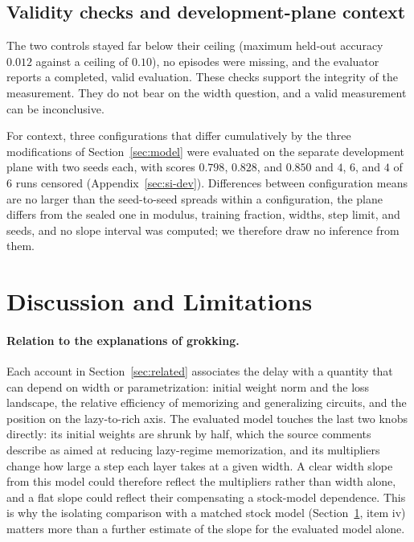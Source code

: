 \documentclass{article}
\begin{document}
\subsection{Validity checks and development-plane context}
The two controls stayed far below their ceiling (maximum held-out accuracy $0.012$ against a ceiling of $0.10$), no episodes were missing, and the evaluator reports a completed, valid evaluation. These checks support the integrity of the measurement. They do not bear on the width question, and a valid measurement can be inconclusive.

For context, three configurations that differ cumulatively by the three modifications of Section~\ref{sec:model} were evaluated on the separate development plane with two seeds each, with scores $0.798$, $0.828$, and $0.850$ and $4$, $6$, and $4$ of $6$ runs censored (Appendix~\ref{sec:si-dev}). Differences between configuration means are no larger than the seed-to-seed spreads within a configuration, the plane differs from the sealed one in modulus, training fraction, widths, step limit, and seeds, and no slope interval was computed; we therefore draw no inference from them.

\section{Discussion and Limitations}
\label{sec:discussion}

\paragraph{Relation to the explanations of grokking.} Each account in Section~\ref{sec:related} associates the delay with a quantity that can depend on width or parametrization: initial weight norm and the loss landscape, the relative efficiency of memorizing and generalizing circuits, and the position on the lazy-to-rich axis. The evaluated model touches the last two knobs directly: its initial weights are shrunk by half, which the source comments describe as aimed at reducing lazy-regime memorization, and its multipliers change how large a step each layer takes at a given width. A clear width slope from this model could therefore reflect the multipliers rather than width alone, and a flat slope could reflect their compensating a stock-model dependence. This is why the isolating comparison with a matched stock model (Section~\ref{sec:discussion}, item iv) matters more than a further estimate of the slope for the evaluated model alone.
\end{document}
